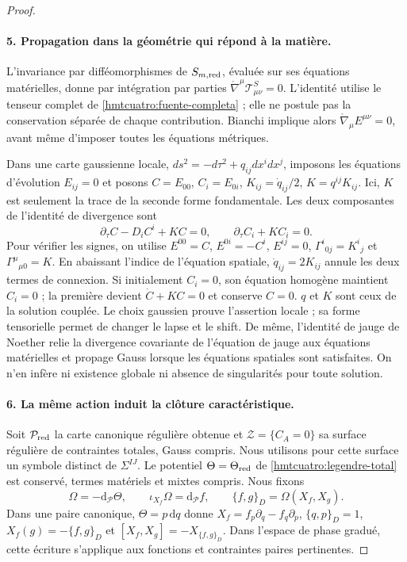 \begin{proof}
\paragraph{5. Propagation dans la géométrie qui répond à la matière.}
L’invariance par difféomorphismes de \(S_{m,\rm red}\), évaluée sur ses équations matérielles, donne par intégration par parties \(\mathring\nabla^\mu\mathcal T^S_{\mu\nu}=0\). L’identité utilise le tenseur complet de \eqref{hmtcuatro:fuente-completa} ; elle ne postule pas la conservation séparée de chaque contribution. Bianchi implique alors \(\mathring\nabla_\mu E^{\mu\nu}=0\), avant même d’imposer toutes les équations métriques.

Dans une carte gaussienne locale, \(ds^2=-d\tau^2+q_{ij}dx^idx^j\), imposons les équations d’évolution \(E_{ij}=0\) et posons \(C=E_{00}\), \(C_i=E_{0i}\), \(K_{ij}=\dot q_{ij}/2\), \(K=q^{ij}K_{ij}\). Ici, \(K\) est seulement la trace de la seconde forme fondamentale. Les deux composantes de l’identité de divergence sont
\begin{equation}
 \partial_\tau C-D_iC^i+KC=0,\qquad
 \partial_\tau C_i+KC_i=0.
 \label{hmtcuatro:propagacion}
\end{equation}
Pour vérifier les signes, on utilise \(E^{00}=C\), \(E^{0i}=-C^i\), \(E^{ij}=0\), \(\Gamma^i{}_{0j}=K^i{}_j\) et \(\Gamma^\mu{}_{\mu0}=K\). En abaissant l’indice de l’équation spatiale, \(\dot q_{ij}=2K_{ij}\) annule les deux termes de connexion. Si initialement \(C_i=0\), son équation homogène maintient \(C_i=0\) ; la première devient \(\dot C+KC=0\) et conserve \(C=0\). \(q\) et \(K\) sont ceux de la solution couplée. Le choix gaussien prouve l’assertion locale ; sa forme tensorielle permet de changer le lapse et le shift. De même, l’identité de jauge de Noether relie la divergence covariante de l’équation de jauge aux équations matérielles et propage Gauss lorsque les équations spatiales sont satisfaites. On n’en infère ni existence globale ni absence de singularités pour toute solution.

\paragraph{6. La même action induit la clôture caractéristique.}
Soit \(\mathcal P_{\rm red}\) la carte canonique régulière obtenue et \(\mathcal Z=\{C_A=0\}\) sa surface régulière de contraintes totales, Gauss compris. Nous utilisons pour cette surface un symbole distinct de \(\Sigma^{IJ}\). Le potentiel \(\Theta=\Theta_{\rm red}\) de \eqref{hmtcuatro:legendre-total} est conservé, termes matériels et mixtes compris. Nous fixons
\begin{equation}
 \Omega=-\mathrm d_{\mathcal P}\Theta,\qquad
 \iota_{X_f}\Omega=\mathrm d_{\mathcal P}f,\qquad
 \{f,g\}_D=\Omega(X_f,X_g).
 \label{hmtcuatro:convenciones-simpecticas}
\end{equation}
Dans une paire canonique, \(\Theta=p\,\mathrm dq\) donne \(X_f=f_p\partial_q-f_q\partial_p\), \(\{q,p\}_D=1\), \(X_f(g)=-\{f,g\}_D\) et \([X_f,X_g]=-X_{\{f,g\}_D}\). Dans l’espace de phase gradué, cette écriture s’applique aux fonctions et contraintes paires pertinentes.


\end{proof}
